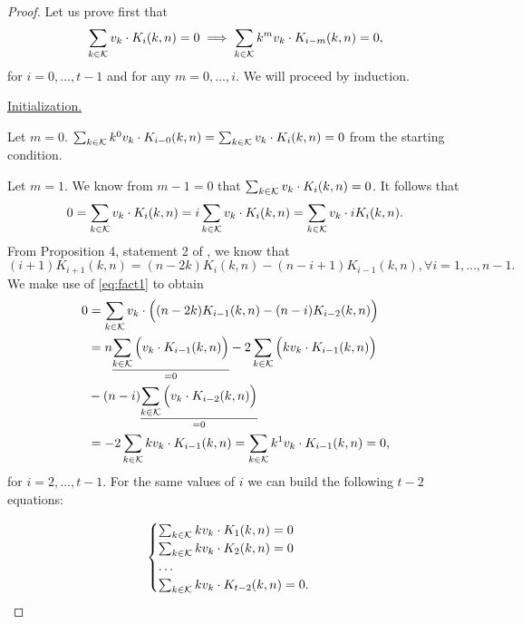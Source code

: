 \begin{proof}
    Let us prove first that
    $$\sum_{k \in \mathcal{K}} v_k \cdot K_i(k, n) = 0 \implies \sum_{k \in \mathcal{K}} k^mv_k \cdot K_{i-m}(k, n) = 0,$$ for $i = 0, \ldots, t-1$ and for any $m = 0, \ldots, i$. We will proceed by induction.

    \underline{Initialization.}

    Let $m = 0$. $\sum_{k \in \mathcal{K}} k^0v_k \cdot K_{i-0}(k, n) = \sum_{k \in \mathcal{K}} v_k \cdot K_i(k, n) = 0$ from the starting condition.

    Let $m = 1$. We know from $m - 1 = 0$ that $\sum_{k \in \mathcal{K}} v_k \cdot K_i(k, n) = 0$. It follows that
    $$
    0 = \sum_{k \in \mathcal{K}} v_k \cdot K_i(k, n) = i\sum_{k \in \mathcal{K}} v_k \cdot K_i(k, n) = \sum_{k \in \mathcal{K}} v_k \cdot iK_i(k, n).
    $$
    From Proposition 4, statement 2 of \cite{DCC:DalMaiSar06}, we know that
    \begin{equation}\label{eq:fact1}
        (i+1)K_{i+1}(k, n) = (n - 2k)K_i(k,n) - (n - i + 1)K_{i-1}(k,n), \forall i = 1, \ldots, n - 1.
    \end{equation}
    We make use of \cref{eq:fact1} to obtain
    \begin{equation*}
    \begin{split}
        0 &= \sum_{k \in \mathcal{K}} v_k \cdot \Big( (n - 2k)K_{i-1}(k, n) - (n - i)K_{i-2}(k, n) \Big)\\
        & = n \underset{=0}{\underline{\sum_{k \in \mathcal{K}} \Big( v_k \cdot K_{i-1}(k, n) \Big)}} - 2\sum_{k \in \mathcal{K}} \Big( kv_k \cdot K_{i-1}(k, n) \Big)\\& - (n-i)\underset{=0}{\underline{\sum_{k \in \mathcal{K}} \Big( v_k \cdot K_{i-2}(k, n) \Big)}}\\
        &= -2\sum_{k \in \mathcal{K}} kv_k \cdot K_{i-1}(k, n) = \sum_{k \in \mathcal{K}} k^1v_k \cdot K_{i-1}(k, n) = 0,
    \end{split}
    \end{equation*}
    for $i = 2, \ldots, t-1$. For the same values of $i$ we can build the following $t-2$ equations:

    \begin{equation*}
        \begin{cases}
            \sum_{k \in \mathcal{K}} kv_k \cdot K_1(k, n) = 0\\
            \sum_{k \in \mathcal{K}} kv_k \cdot K_2(k, n) = 0\\
            \ldots\\
            \sum_{k \in \mathcal{K}} kv_k \cdot K_{t-2}(k, n) = 0.\\
        \end{cases}
    \end{equation*}


\end{proof}

